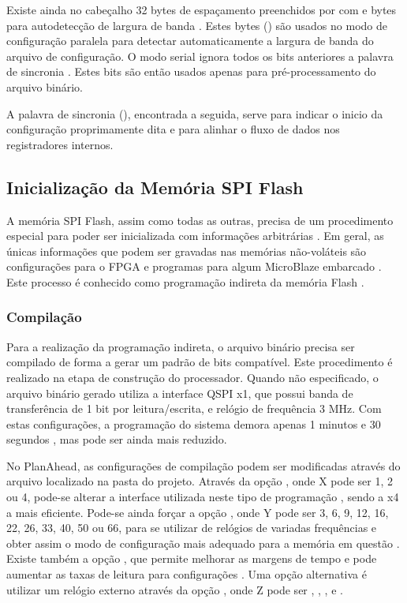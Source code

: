 \documentclass[11pt,a4paper,oneside]{book}
\begin{document}
Existe ainda no cabeçalho 32 bytes de espaçamento preenchidos por com  e bytes para autodetecção de largura de banda \cite{ug470, xapp583}.
Estes bytes () são usados no modo de configuração paralela para detectar automaticamente a largura de banda do arquivo de configuração.
O modo serial ignora todos os bits anteriores a palavra de sincronia \cite{xapp583}.
Estes bits são então usados apenas para pré-processamento do arquivo binário.

A palavra de sincronia (), encontrada a seguida, serve para indicar o inicio da configuração proprimamente dita e para alinhar o fluxo de dados nos registradores internos.

\subsection{Inicialização da Memória SPI Flash}
\label{sec:flash_indireta}
A memória SPI Flash, assim como todas as outras, precisa de um procedimento especial para poder ser inicializada com informações arbitrárias \cite{xapp694}.
Em geral, as únicas informações que podem ser gravadas nas memórias não-voláteis são configurações para o FPGA e programas para algum MicroBlaze embarcado \cite{ug111}.
Este processo é conhecido como programação indireta da memória Flash \cite{xapp586}.

\subsubsection{Compilação}
Para a realização da programação indireta, o arquivo binário precisa ser compilado de forma a gerar um padrão de bits compatível.
Este procedimento é realizado na etapa de construção do processador.
Quando não especificado, o arquivo binário gerado utiliza a interface QSPI x1, que possui banda de transferência de 1 bit por leitura/escrita,  e relógio de frequência 3 MHz.
Com estas configurações, a programação do sistema demora apenas 1 minutos e 30 segundos \cite{xapp586}, mas pode ser ainda mais reduzido.

No PlanAhead, as configurações de compilação podem ser modificadas através do arquivo  localizado na pasta  do projeto.
Através da opção , onde X pode ser 1, 2 ou 4, pode-se alterar a interface utilizada neste tipo de programação \cite{ug628, xapp586}, sendo a x4 a mais eficiente.
Pode-se ainda forçar a opção , onde Y pode ser 3, 6, 9, 12, 16, 22, 26, 33, 40, 50 ou 66, para se utilizar de relógios de variadas frequências e obter assim o modo de configuração mais adequado para a memória em questão \cite{xapp586, ug628, ug810}.
Existe também a opção , que permite melhorar as margens de tempo e pode aumentar as taxas de leitura para configurações \cite{ug628, ug586}.
Uma opção alternativa é utilizar um relógio externo através da opção , onde Z pode ser , , ,  e .
\end{document}
